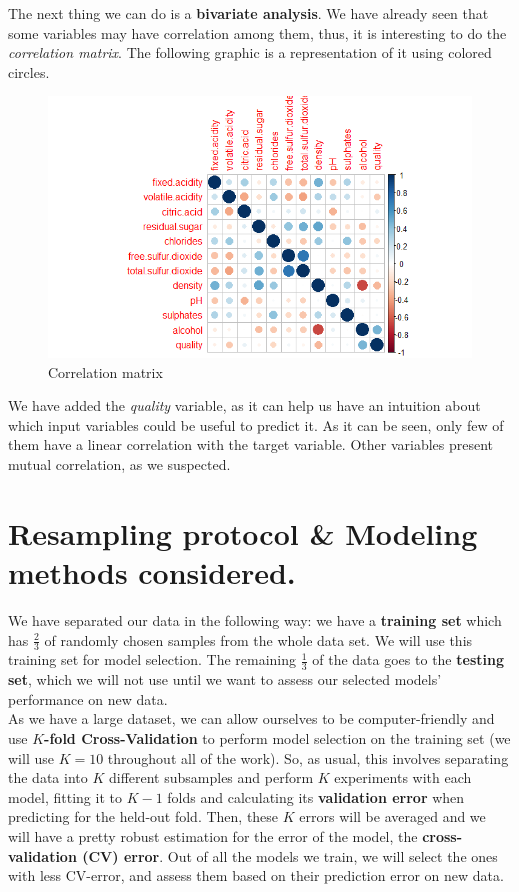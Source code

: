 \documentclass[10pt]{article}
\begin{document}
The next thing we can do is a \textbf{bivariate analysis}. We have already seen that some variables may have correlation among them, thus, it is interesting to do the \textit{correlation matrix}. The following graphic is a representation of it using colored circles. \\
\begin{figure}[H]
\centering
\caption{Correlation matrix}
\includegraphics[scale=0.5]{matrix_correlation_circles}
\end{figure}
We have added the \textit{quality} variable, as it can help us have an intuition about which input variables could be useful to predict it. As it can be seen, only few of them have a linear correlation with the target variable. Other variables present mutual correlation, as we suspected.

\section{Resampling protocol \& Modeling methods considered.}
We have separated our data in the following way: we have a \textbf{training set} which has $\frac{2}{3}$ of randomly chosen samples from the whole data set. We will use this training set for model selection. The remaining $\frac13$ of the data goes to the \textbf{testing set}, which we will not use until we want to assess our selected models' performance on new data.\\

As we have a large dataset, we can allow ourselves to be computer-friendly and use \textbf{$K$-fold Cross-Validation} to perform model selection on the training set (we will use $K=10$ throughout all of the work). So, as usual, this involves separating the data into $K$ different subsamples and perform $K$ experiments with each model, fitting it to $K-1$ folds and calculating its \textbf{validation error} when predicting for the held-out fold. Then, these $K$ errors will be averaged and we will have a pretty robust estimation for the error of the model, the \textbf{cross-validation (CV) error}. Out of all the models we train, we will select the ones with less CV-error, and assess them based on their prediction error on new data.\\
\end{document}
